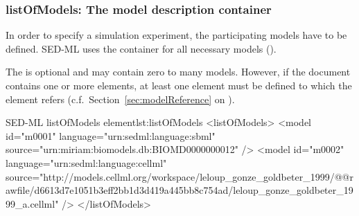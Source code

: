   \subsubsection{listOfModels: The model description container}
\label{sec:listOfModels}
In order to specify a simulation experiment, the participating models have to be defined. SED-ML uses the  container for all necessary models (). 

%

The  is optional and may contain zero to many models. However, if the \LoneVtwo document contains  one or more  elements, at least one  element must be defined to which the  element refers (c.f.\ Section~\ref{sec:modelReference} on ).
%
\begin{myXmlLst}{SED-ML listOfModels element}{lst:listOfModels}
<listOfModels>
 <model id="m0001" language="urn:sedml:language:sbml" 
  source="urn:miriam:biomodels.db:BIOMD0000000012" />
 <model id="m0002" language="urn:sedml:language:cellml" 
  source="http://models.cellml.org/workspace/leloup_gonze_goldbeter_1999/@@rawfile/d6613d7e1051b3eff2bb1d3d419a445bb8c754ad/leloup_gonze_goldbeter_1999_a.cellml" />
</listOfModels>
\end{myXmlLst}
%



